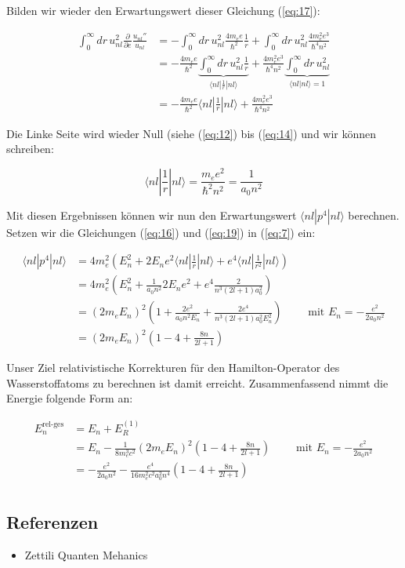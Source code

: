 Bilden wir wieder den Erwartungswert dieser Gleichung (\ref{eq:17}):

\begin{align}
  \label{eq:18}
\int_0^\infty dr\, u_{nl}^2\frac{\partial}{\partial e}\frac{u_{nl}''}{u_{nl}} &= -\int_0^\infty dr\, u_{nl}^2 \frac{4m_e e}{\hbar^2}\frac{1}{r}+ \int_0^\infty dr\, u_{nl}^2\frac{4m_e^2e^3}{\hbar^4 n^2} \\
 &= -\frac{4m_e e}{\hbar^2} \underbrace{\int_0^\infty dr\, u_{nl}^2 \frac{1}{r}}_{\langle nl|\frac{1}{r}|nl\rangle } + \frac{4m_e^2e^3}{\hbar^4 n^2}\underbrace{ \int_0^\infty dr\, u_{nl}^2}_{\langle nl|nl\rangle =1} \\
 &= -\frac{4m_e e}{\hbar^2} \langle nl|\frac{1}{r}|nl\rangle  + \frac{4m_e^2e^3}{\hbar^4 n^2}
\end{align}


Die Linke Seite wird wieder Null (siehe (\ref{eq:12}) bis (\ref{eq:14}) und wir können schreiben:

\begin{equation}
  \label{eq:19}
  \boxed{\langle nl|\frac{1}{r}|nl\rangle = \frac{m_e e^2}{ \hbar^2 n^2} = \frac{1}{a_0 n^2}}
\end{equation}

Mit diesen Ergebnissen können wir nun den Erwartungswert \(\langle nl | p^4 |nl \rangle \) berechnen. Setzen wir die Gleichungen (\ref{eq:16}) und (\ref{eq:19}) in (\ref{eq:7}) ein:

\begin{align}
  \label{eq:20}
   \langle nl|p^4|nl\rangle &= 4m_e^2 \left( E_n^2 + 2E_ne^2\langle nl| \frac{1}{r}|nl\rangle + e^4\langle nl|\frac{1}{r^2}|nl\rangle\right)  \\
&= 4m_e^2 \left( E_n^2 + \frac{1}{a_0 n^2}2E_ne^2 + e^4 \frac{2}{n^3(2l+1)a_0^2}  \right) \\
&= (2m_eE_n)^2 \left( 1 + \frac{2e^2}{a_0 n^2E_n} +  \frac{2e^4}{n^3(2l+1)a_0^2E_n^2}  \right) \qquad \text{ mit }E_n=-\frac{e^2}{2a_0n^2} \\
&= (2m_eE_n)^2 \left( 1 - 4 +  \frac{8n }{2l+1}  \right)
\end{align}


Unser Ziel relativistische Korrekturen für den Hamilton-Operator des Wasserstoffatoms zu berechnen ist damit erreicht. Zusammenfassend nimmt die Energie folgende Form an:

\begin{align}
  \label{eq:21}
  E_n^{\text{rel-ges}} &= E_n + E^{(1)}_R\\
&= E_n - \frac{1}{8m_e^3c^2}(2m_eE_n)^2 \left( 1 - 4 +  \frac{8n }{2l+1}  \right)\qquad \text{ mit }E_n=-\frac{e^2}{2a_0n^2}  \\
&= -\frac{e^2}{2a_0n^2} - \frac{e^4}{16m_e^2c^2a_0^2n^4 } \left( 1 - 4 +  \frac{8n }{2l+1}  \right) \\
\end{align}




\subsection*{Referenzen}
\begin{itemize}
\item Zettili Quanten Mehanics
\end{itemize}



